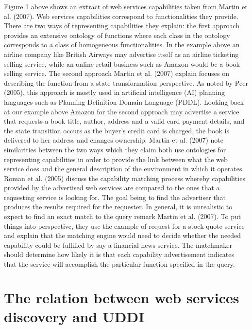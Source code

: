 \documentclass{article}
\begin{document}
Figure 1 above shows an extract of web services capabilities taken from Martin et al. (2007). Web services capabilities correspond to functionalities they provide. There are two ways of representing capabilities they explain: the first approach provides an extensive ontology of functions where each class in the ontology corresponds to a class of homogeneous functionalities. In the example above an airline company like British Airways may advertise itself as an airline ticketing selling service, while an online retail business such as Amazon would be a book selling service. The second approach Martin et al. (2007) explain focuses on describing the function from a state transformation perspective. As noted by Peer (2005), this approach is mostly used in artificial intelligence (AI) planning languages such as Planning Definition Domain Language (PDDL). Looking back at our example above Amazon for the second approach may advertise a service that requests a book title, author, address and a valid card payment details, and the state transition occurs as the buyer’s credit card is charged, the book is delivered to her address and changes ownership. Martin et al. (2007) note similarities between the two ways which they claim both use ontologies for representing capabilities in order to provide the link between what the web service does and the general description of the environment in which it operates. Roman et al. (2005) discuss the capability matching process whereby capabilities provided by the advertised web services are compared to the ones that a requesting service is looking for. The goal being to find the advertiser that produces the results required for the requester. In general, it is unrealistic to expect to find an exact match to the query remark Martin et al. (2007). To put things into perspective, they use the example of request for a stock quote service and explain that the matching engine would need to decide whether the needed capability could be fulfilled by say a financial news service. The matchmaker should determine how likely it is that each capability advertisement indicates that the service will accomplish the particular function specified in the query.

\section{The relation between web services discovery and UDDI}
\end{document}
